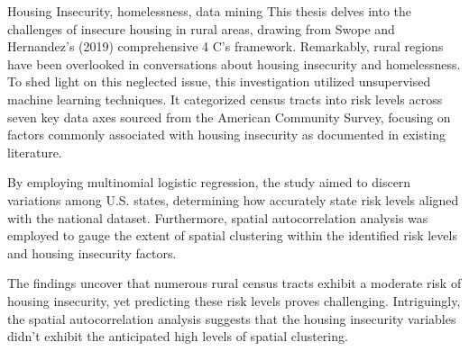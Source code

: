 
\begin{abstract}
This thesis explores rural housing insecurity through Swope and Hernandez’s (2019) 4 C's of housing insecurity in rural areas. Little attention has been paid to rural areas in the conversation on housing insecurity and houselessness. To facilitate further discussion on this understudied issue, this exploratory study used unsupervised machine learning to group census tracts into risk levels across 7 axes of data from the American Community Survey. These were based on housing insecurity factors found in the literature. Multinomial logistic regression was used to determine variation between U.S. states based on how well state risk levels could be predicted with the national dataset. Furthermore, spatial autocorrelation analysis was employed to gauge the extent of spatial clustering within the identified risk levels and housing insecurity factors. The results indicate that many rural census tracts have a medium risk of housing insecurity, and the risk levels are hard to predict. The spatial autocorrelation results show that the housing insecurity variables were not as highly spatially clustered as expected.  
\end{abstract}

\begin{layabstract}{Housing Insecurity, homelessness, data mining}	%
This thesis delves into the challenges of insecure housing in rural areas, drawing from Swope and Hernandez's (2019) comprehensive 4 C's framework. Remarkably, rural regions have been overlooked in conversations about housing insecurity and homelessness. To shed light on this neglected issue, this investigation utilized unsupervised machine learning techniques. It categorized census tracts into risk levels across seven key data axes sourced from the American Community Survey, focusing on factors commonly associated with housing insecurity as documented in existing literature.

By employing multinomial logistic regression, the study aimed to discern variations among U.S. states, determining how accurately state risk levels aligned with the national dataset. Furthermore, spatial autocorrelation analysis was employed to gauge the extent of spatial clustering within the identified risk levels and housing insecurity factors.

The findings uncover that numerous rural census tracts exhibit a moderate risk of housing insecurity, yet predicting these risk levels proves challenging. Intriguingly, the spatial autocorrelation analysis suggests that the housing insecurity variables didn't exhibit the anticipated high levels of spatial clustering.


\end{layabstract}


